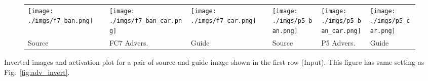 \documentclass{article} %
\begin{document}
\begin{subfigure}[t]{\linewidth}{
\centering
\renewcommand{\arraystretch}{1}
\setlength\tabcolsep{.1pt}
\begin{tabular}{
|>{\centering\arraybackslash}m{0.205\linewidth}
>{\centering\arraybackslash}m{0.205\linewidth}
>{\centering\arraybackslash}m{0.205\linewidth}|
>{\centering\arraybackslash}m{0.125\linewidth}
>{\centering\arraybackslash}m{0.125\linewidth}
>{\centering\arraybackslash}m{0.125\linewidth}|
}
\hline
\texttt{[image: ./imgs/f7\_ban.png]} &
\texttt{[image: ./imgs/f7\_ban\_car.png]} &
\texttt{[image: ./imgs/f7\_car.png]} &
\texttt{[image: ./imgs/p5\_ban.png]} &
\texttt{[image: ./imgs/p5\_ban\_car.png]} &
\texttt{[image: ./imgs/p5\_car.png]}\\
Source & FC7 Advers. & Guide & Source & P5 Advers. & Guide \\ \hline
\end{tabular}
}
\end{subfigure}
\caption{
    Inverted images and activation plot for a pair of source and guide image
    shown in the first row (Input). This figure has same setting as
    Fig.~\ref{fig:adv_invert}.
}
\label{fig:adv_invert5}
\end{document}

